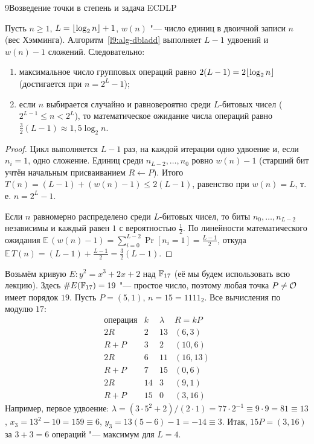 \begin{lecture}{9}{Возведение точки в степень и задача ECDLP}
\begin{theorem}\label{l9:dbladd-cost}
Пусть $n \ge 1$, $L = \lfloor\log_2 n\rfloor + 1$, $w(n)$ "--- число единиц в двоичной записи $n$
(вес Хэмминга). Алгоритм~\ref{l9:alg-dbladd} выполняет $L - 1$ удвоений и $w(n) - 1$ сложений.
Следовательно:
\begin{enumerate}
  \item максимальное число групповых операций равно $2(L - 1) = 2\lfloor\log_2 n\rfloor$
    (достигается при $n = 2^L - 1$);
  \item если $n$ выбирается случайно и равновероятно среди $L$-битовых чисел
    ($2^{L-1} \le n < 2^L$), то математическое ожидание числа операций равно
    $\frac32 (L - 1) \approx 1{,}5 \log_2 n$.
\end{enumerate}
\end{theorem}

\begin{proof}
Цикл выполняется $L - 1$ раз, на каждой итерации одно удвоение и, если $n_i = 1$, одно
сложение. Единиц среди $n_{L-2}, \dots, n_0$ ровно $w(n) - 1$ (старший бит учтён начальным
присваиванием $R \gets P$). Итого $T(n) = (L - 1) + (w(n) - 1) \le 2(L - 1)$, равенство при
$w(n) = L$, т.\,е. $n = 2^L - 1$.

Если $n$ равномерно распределено среди $L$-битовых чисел, то биты $n_0, \dots, n_{L-2}$
независимы и каждый равен $1$ с вероятностью $\frac12$. По линейности математического
ожидания $\mathbb{E}\,(w(n) - 1) = \sum_{i=0}^{L-2} \Pr[n_i = 1] = \frac{L-1}{2}$, откуда
$\mathbb{E}\,T(n) = (L - 1) + \frac{L - 1}{2} = \frac32 (L - 1)$.
\end{proof}

\begin{example}\label{l9:ex-15P}
Возьмём кривую $E\colon y^2 = x^3 + 2x + 2$ над $\mathbb{F}_{17}$ (её мы будем использовать всю
лекцию). Здесь $\#E(\mathbb{F}_{17}) = 19$ "--- простое число, поэтому любая точка $P \ne \mathcal{O}$
имеет порядок $19$. Пусть $P = (5, 1)$, $n = 15 = 1111_2$. Все вычисления по модулю $17$:
\[
\begin{array}{l|r|r|c}
  \text{операция} & k & \lambda & R = kP \\ \hline
  2R    & 2  & 13 & (6, 3)   \\
  R + P & 3  & 2  & (10, 6)  \\
  2R    & 6  & 11 & (16, 13) \\
  R + P & 7  & 15 & (0, 6)   \\
  2R    & 14 & 3  & (9, 1)   \\
  R + P & 15 & 0  & (3, 16)
\end{array}
\]
Например, первое удвоение: $\lambda = (3 \cdot 5^2 + 2)/(2 \cdot 1) = 77 \cdot 2^{-1} \equiv 9
\cdot 9 = 81 \equiv 13$, $x_3 = 13^2 - 10 = 159 \equiv 6$, $y_3 = 13(5 - 6) - 1 = -14 \equiv 3$.
Итак, $15P = (3, 16)$ за $3 + 3 = 6$ операций "--- максимум для $L = 4$.
\end{example}


\end{lecture}
